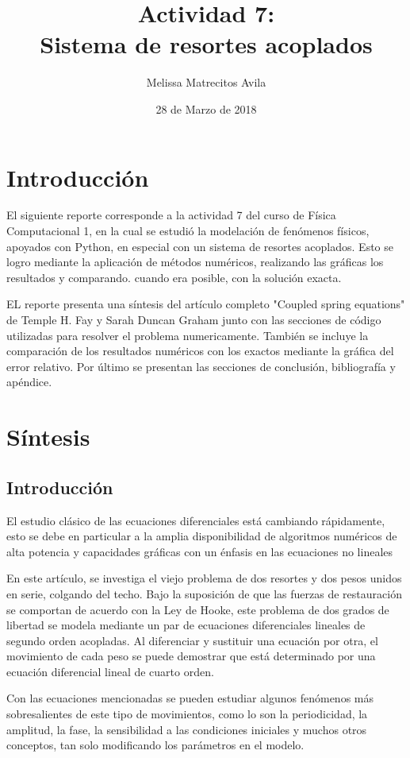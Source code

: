 \documentclass{article}
\title{Actividad 7:\\ Sistema de resortes acoplados}
\author{Melissa Matrecitos Avila}
\date{28 de Marzo de 2018}
\begin{document}
\maketitle
\section{Introducción}
El siguiente reporte corresponde a la actividad 7 del curso de Física Computacional 1, en la cual se estudió la modelación de fenómenos físicos, apoyados con Python, en especial con un sistema de resortes acoplados. Esto se logro mediante la aplicación de métodos numéricos, realizando las gráficas los resultados y comparando. cuando era posible, con la solución exacta.

EL reporte presenta una síntesis del artículo completo "Coupled spring equations" de  Temple H. Fay y Sarah Duncan Graham junto con las secciones de código utilizadas para resolver el problema numericamente. También se incluye la comparación de los resultados numéricos con los exactos mediante la gráfica del error relativo. Por último se presentan las secciones de conclusión, bibliografía y apéndice.

\section{Síntesis}
\subsection{Introducción}
El estudio clásico de las ecuaciones diferenciales está cambiando rápidamente, esto se debe en particular a la amplia disponibilidad de algoritmos numéricos de alta potencia y capacidades gráficas con un énfasis en las ecuaciones no lineales

En este artículo, se investiga el viejo problema de dos resortes y dos pesos unidos en serie, colgando del techo. Bajo la suposición de que las fuerzas de restauración se comportan de acuerdo con la Ley de Hooke, este problema de dos grados de libertad se modela mediante un par de ecuaciones diferenciales lineales de segundo orden acopladas. Al diferenciar y sustituir una ecuación por otra, el movimiento de cada peso se puede demostrar que está determinado por una ecuación diferencial lineal de cuarto orden.

Con las ecuaciones mencionadas se pueden estudiar algunos fenómenos más sobresalientes de este tipo de movimientos, como lo son la periodicidad, la amplitud, la fase, la sensibilidad a las condiciones iniciales y muchos otros conceptos, tan solo modificando los parámetros en el modelo.
\end{document}
